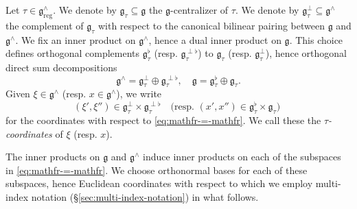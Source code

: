 \documentclass[reqno]{amsart}
\DeclareMathOperator{\reg}{reg}
\theoremstyle{plain} \newtheorem{theorem} {Theorem}
\theoremstyle{definition} \newtheorem{definition} [theorem] {Definition}
\theoremstyle{itplain} %
\numberwithin{equation}{section}
\numberwithin{theorem}{section}
\begin{document}
Let $\tau \in \mathfrak{g}^\wedge_{\reg}$.  We denote by $\mathfrak{g}_{\tau} \subseteq \mathfrak{g}$ the $\mathfrak{g}$-centralizer of $\tau$.  We denote by $\mathfrak{g}_\tau^{\perp} \subseteq \mathfrak{g}^\wedge$ the complement of $\mathfrak{g}_\tau$ with respect to the canonical bilinear pairing between $\mathfrak{g}$ and $\mathfrak{g}^\wedge$.  We fix an inner product on $\mathfrak{g}^\wedge$, hence a dual inner product on $\mathfrak{g}$.  This choice defines orthogonal complements $\mathfrak{g}_{\tau}^{\flat}$ (resp. $\mathfrak{g}_\tau^{\perp \flat}$) to $\mathfrak{g}_\tau$ (resp. $\mathfrak{g}_\tau^{\perp}$), hence orthogonal direct sum decompositions 
\begin{equation}\label{eq:mathfr-=-mathfr}
  \mathfrak{g}^\wedge = \mathfrak{g}_\tau^\perp \oplus \mathfrak{g}_\tau^{\perp \flat},
  \quad 
  \mathfrak{g} = \mathfrak{g}_\tau^{\flat} \oplus \mathfrak{g}_\tau.
\end{equation}
Given $\xi \in \mathfrak{g}^\wedge$ (resp. $x \in \mathfrak{g}^\wedge$), we write
\begin{equation*}
  (\xi ', \xi '' ) \in \mathfrak{g}_\tau^{\perp} \times \mathfrak{g}_{\tau}^{\perp \flat}
  \quad
  \text{
    (resp.
    $(x ', x '' ) \in \mathfrak{g}_\tau^{\flat} \times  \mathfrak{g}_\tau$)
  }
\end{equation*}
for the coordinates with respect to \eqref{eq:mathfr-=-mathfr}.  We call these the \emph{$\tau$-coordinates} of $\xi$ (resp. $x$).  

The inner products on $\mathfrak{g}$ and $\mathfrak{g}^\wedge$ induce inner products on each of the subspaces in \eqref{eq:mathfr-=-mathfr}.  We choose orthonormal bases for each of these subspaces, hence Euclidean coordinates with respect to which we employ multi-index notation (\S\ref{sec:multi-index-notation}) in what follows.
\end{document}
